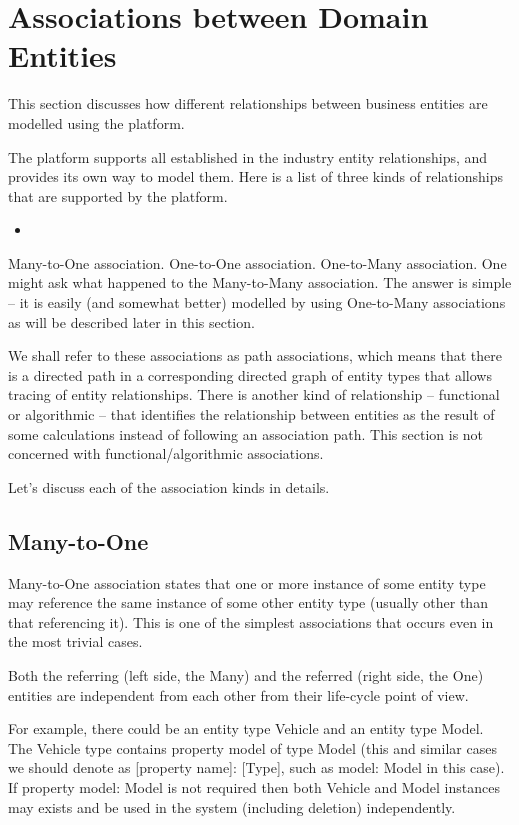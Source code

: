 \chapter{Associations between Domain Entities}\label{ch01:02}

  This section discusses how different relationships between business entities are modelled using the platform.

  The platform supports all established in the industry entity relationships, and provides its own way to model them. Here is a list of three kinds of relationships that are supported by the platform.
  \begin{itemize}
   \item 
  \end{itemize}

Many-to-One association.
One-to-One association.
One-to-Many association.
One might ask what happened to the Many-to-Many association. The answer is simple -- it is easily (and somewhat better) modelled by using One-to-Many associations as will be described later in this section.

We shall refer to these associations as path associations, which means that there is a directed path in a corresponding directed graph of entity types that allows tracing of entity relationships. There is another kind of relationship -- functional or algorithmic -- that identifies the relationship between entities as the result of some  calculations instead of following an association path. This section is not concerned with functional/algorithmic associations.

Let's discuss each of the association kinds in details.

\section{Many-to-One}

  Many-to-One association states that one or more instance of some entity type may reference the same instance of some other entity type (usually other than that referencing it). This is one of the simplest associations that occurs even in the most trivial cases.

  Both the referring (left side, the Many) and the referred (right side, the One) entities are independent from each other from their life-cycle point of view.

  For example, there could be an entity type Vehicle and an entity type Model. The Vehicle type contains property model of type Model (this and similar cases we should denote as [property name]: [Type], such as model: Model in this case). If property model: Model is not required then both Vehicle and Model instances may exists and be used in the system (including deletion) independently.

